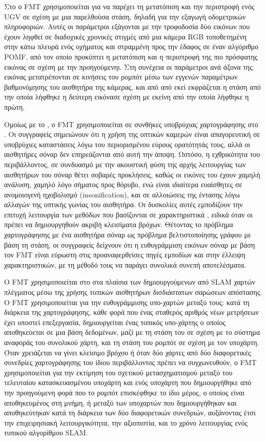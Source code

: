 Στο \cite{Kazik2011} ο FMT χρησιμοποιείται για να παρέχει τη μετατόπιση και την
περιστροφή ενός UGV σε σχέση με μια παρελθούσα στάση, δηλαδή για την εξαγωγή
οδομετρικών πληροφοριών. Αυτές οι παράμετροι εξάγονται με την τροφοδοσία δύο
εικόνων που έχουν ληφθεί σε διαδοχικές χρονικές στιγμές από μια κάμερα RGB
τοποθετημένη στην κάτω πλευρά ενός οχήματος και στραμμένη προς την έδαφος σε
έναν αλγόριθμο POMF, από τον οποίο προκύπτει η μετατόπιση και η περιστροφή της
πιο πρόσφατης εικόνας σε σχέση με την προηγούμενηι. Στη συνέχεια οι παράμετροι
ανά άξονα της εικόνας μετατρέπονται σε κινήσεις του ρομπότ μέσω των εγγενών
παραμέτρων βαθμονόμησης του αισθητήρα της κάμερας, και από από εκεί εκφράζεται
η στάση από την οποία λήφθηκε η δεύτερη εικόνασε σχέση με εκείνη από την οποία
λήφθηκε η πρώτη.

Ομοίως με το \cite{Bulow2010}, ο FMT χρησιμοποιείται σε συνθήκες υποβρύχιας
χαρτογράφησης στο \cite{Hurtos2012}. Οι συγγραφείς σημειώνουν ότι η χρήση της
οπτικών καμερών είναι απαγορευτική σε υποβρύχιες καταστάσεις λόγω του
περιορισμένου εύρους ορατότητάς τους, αλλά οι αισθητήρες σόναρ δεν επηρεάζονται
από αυτή την άποψη. Ωστόσο, η εχθρικότητα του περιβάλλοντος, σε συνδυασμό με
την ακουστική φύση της αρχής λειτουργίας των αισθητήρων του σόναρ θέτει σοβαρές
προκλήσεις, καθώς οι εικόνες του έχουν χαμηλή ανάλυση, χαμηλό λόγο σήματος προς
θόρυβο, ενώ είναι ιδιαίτερα ευαίσθητες σε ανομοιογενή ηχοβολισμό
(insonification), και σε αλλοιώσεις της έντασης λόγω αλλαγών της οπτικής γωνίας
του αισθητήρα. Οι δυσκολίες αυτές εμποδίζουν την επιτυχή λειτουργία των μεθόδων
που βασίζονται σε χαρακτηριστικά \cite{Kim2005,Lowe2004}, ειδικά όταν οι πρέπει
να δημιουργηθούν ακριβή κλεισίματα βρόχων. Θέτοντας το πρόβλημα χαρτογράφησης
με ένα αισθητήρα σόναρ ως πρόβλημα βελτιστοποίησης γράφου με βάση τη στάση, οι
συγγραφείς δείχνουν ότι η ευθυγράμμιση εικόνων σόναρ με βάση τον FMT είναι
εύρωστη στις προαναφερθείσες πηγές εμποδίων και στην έλλειψη χαρακτηριστικών,
με τη μέθοδό τους να παράγει συνολικά συνεπή αποτελέσματα.

Ο FMT χρησιμοποιείται στο \cite{Oberlander2013} στα πλαίσια των δημιουργούμενων
από SLAM χαρτών πλέγματος μέσω της χρήσης τυπικών αισθητήρων δισδιάστατων
σαρώσεων απόστασης. Ο FMT χρησιμοποιείται για την ευθυγράμμισης υπο-χαρτών
μεταξύ τους: κατά τη διάρκεια της χαρτογράφησης, κάθε φορά που ένας σταθερός
αριθμός νέων μετρήσεων έχει υποστεί επεξεργασία, δημιουργείται ένας τοπικός
υπο-χάρτης ο οποίος αποθηκεύεται σε μια βάση δεδομένων, μαζί με τη στάση του σε
σχέση με το σύστημα αναφοράς του συνολικού χάρτη, και τη στάση του ρομπότ σε
σχέση με τον υποχάρτη. Όταν χρειάζεται να γίνει κλείσιμο βρόχου ή όταν δύο
χάρτες από δύο διαφορετικές συνεδρίες χαρτογράφησης του ίδιου περιβάλλοντος
πρέπει να συγχωνευθούν, ο FMT χρησιμοποιείται για την εκτίμηση του σχετικού
μετασχηματισμού μεταξύ του τελευταίου κατασκευασμένου υποχάρτη και ενός
υποχάρτη που δημιουργήθηκε από την προηγούμενη φορά που το ρομπότ επισκέφθηκε
το ίδιο μέρος, ο οποίος είναι αποθηκευμένος στη μνήμη, ή μεταξύ των υποχαρτών
που δημιουργήθηκαν και αποθηκεύτηκαν κατά τη διάρκεια των δύο διαφορετικών
συνεδριών, αυξάνοντας έτσι την επιχειρησιακή λειτουργικότητα, την αξιοπιστία,
και το χρόνο λειτουργίας ενός τυπικού αλγορίθμου SLAM.

